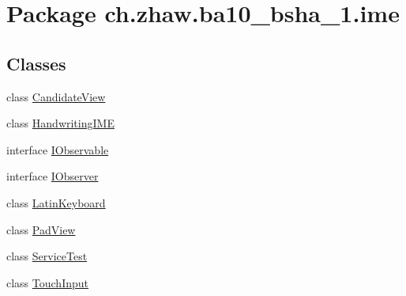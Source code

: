 \hypertarget{namespacech_1_1zhaw_1_1ba10__bsha__1_1_1ime}{
\section{Package ch.zhaw.ba10\_\-bsha\_\-1.ime}
\label{namespacech_1_1zhaw_1_1ba10__bsha__1_1_1ime}
}
\subsection*{Classes}
\begin{DoxyCompactItemize}
\item 
class \hyperlink{classch_1_1zhaw_1_1ba10__bsha__1_1_1ime_1_1CandidateView}{CandidateView}
\item 
class \hyperlink{classch_1_1zhaw_1_1ba10__bsha__1_1_1ime_1_1HandwritingIME}{HandwritingIME}
\item 
interface \hyperlink{interfacech_1_1zhaw_1_1ba10__bsha__1_1_1ime_1_1IObservable}{IObservable}
\item 
interface \hyperlink{interfacech_1_1zhaw_1_1ba10__bsha__1_1_1ime_1_1IObserver}{IObserver}
\item 
class \hyperlink{classch_1_1zhaw_1_1ba10__bsha__1_1_1ime_1_1LatinKeyboard}{LatinKeyboard}
\item 
class \hyperlink{classch_1_1zhaw_1_1ba10__bsha__1_1_1ime_1_1PadView}{PadView}
\item 
class \hyperlink{classch_1_1zhaw_1_1ba10__bsha__1_1_1ime_1_1ServiceTest}{ServiceTest}
\item 
class \hyperlink{classch_1_1zhaw_1_1ba10__bsha__1_1_1ime_1_1TouchInput}{TouchInput}
\end{DoxyCompactItemize}

